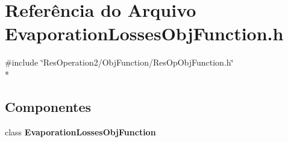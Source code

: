 \section{Referência do Arquivo Evaporation\+Losses\+Obj\+Function.\+h}
\label{_2_obj_function_2_evaporation_losses_2_evaporation_losses_obj_function_8h}
{\ttfamily \#include \char`\"{}Res\+Operation2/\+Obj\+Function/\+Res\+Op\+Obj\+Function.\+h\char`\"{}}\\*
\subsection*{Componentes}
\begin{DoxyCompactItemize}
\item 
class {\bf Evaporation\+Losses\+Obj\+Function}
\end{DoxyCompactItemize}
